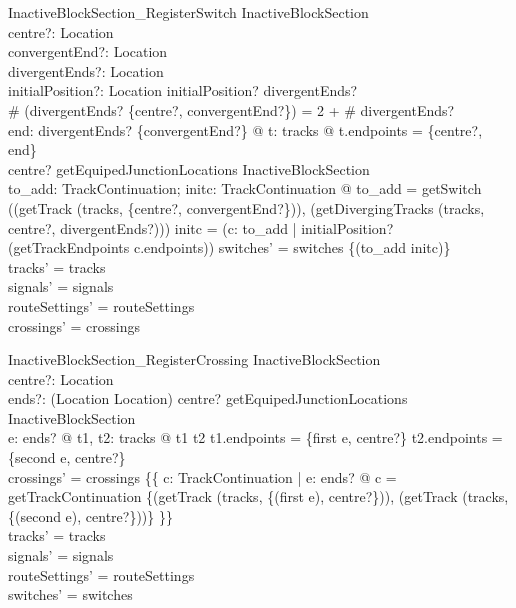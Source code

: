 \begin{schema}{InactiveBlockSection\_RegisterSwitch}
  \Delta InactiveBlockSection\\
  centre?: Location\\
  convergentEnd?: Location\\
  divergentEnds?: \finset  Location\\
  initialPosition?: Location
\where
  initialPosition? \in  divergentEnds?\\
  \# (divergentEnds? \cup  \{centre?, convergentEnd?\}) = 2 + \# divergentEnds?\\
  \forall  end: divergentEnds? \cup  \{convergentEnd?\} @ \exists  t: tracks @ t.endpoints = \{centre?, end\}\\
  centre? \notin  getEquipedJunctionLocations \theta  InactiveBlockSection\\
  \exists  to\_add: \finset  TrackContinuation; initc: TrackContinuation @ to\_add = getSwitch ((getTrack (tracks, \{centre?, convergentEnd?\})), (getDivergingTracks (tracks, centre?, divergentEnds?))) \land  initc = (\mu  c: to\_add | initialPosition? \in  \bigcup  (getTrackEndpoints c.endpoints)) \land  switches' = switches \oplus  \{(to\_add \mapsto  initc)\}\\
  tracks' = tracks\\
  signals' = signals\\
  routeSettings' = routeSettings\\
  crossings' = crossings
\end{schema}

\begin{schema}{InactiveBlockSection\_RegisterCrossing}
  \Delta InactiveBlockSection\\
  centre?: Location\\
  ends?: \finset  (Location \cross  Location)
\where
  centre? \notin  getEquipedJunctionLocations \theta  InactiveBlockSection\\
  \forall  e: ends? @ \exists  t1, t2: tracks @ t1 \neq  t2 \land  t1.endpoints = \{first e, centre?\} \land  t2.endpoints = \{second e, centre?\}\\
  crossings' = crossings \cup  \{\{  c: TrackContinuation | \exists  e: ends? @ c = getTrackContinuation \{(getTrack (tracks, \{(first e), centre?\})), (getTrack (tracks, \{(second e), centre?\}))\} \}\}\\
  tracks' = tracks\\
  signals' = signals\\
  routeSettings' = routeSettings\\
  switches' = switches
\end{schema}

